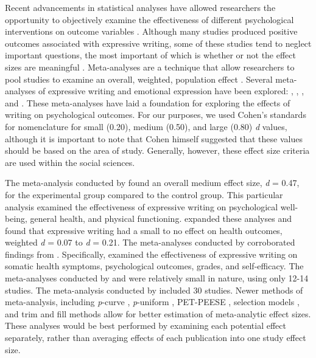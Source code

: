 \documentclass[english,man]{apa6}
\theoremstyle{definition}
\theoremstyle{definition}
\theoremstyle{definition}
\theoremstyle{remark}
\begin{document}
Recent advancements in statistical analyses have allowed researchers the
opportunity to objectively examine the effectiveness of different
psychological interventions on outcome variables
\autocites{Glass1976}{Borenstein2007}{Hedges1982}. Although many studies
produced positive outcomes associated with expressive writing, some of
these studies tend to neglect important questions, the most important of
which is whether or not the effect sizes are meaningful
\autocite{Smyth1998}. Meta-analyses are a technique that allow
researchers to pool studies to examine an overall, weighted, population
effect \autocite{Borenstein2007}. Several meta-analyses of expressive
writing and emotional expression have been explored:
\textcite{Smyth1998}, \textcite{Frisina2004a},
\textcite{Frattaroli2006}, and \textcite{Mogk2006}. These meta-analyses
have laid a foundation for exploring the effects of writing on
psychological outcomes. For our purposes, we used Cohen's
\autocite*{Cohen1988} standards for nomenclature for small (0.20),
medium (0.50), and large (0.80) \emph{d} values, although it is
important to note that Cohen himself suggested that these values should
be based on the area of study. Generally, however, these effect size
criteria are used within the social sciences.

The meta-analysis conducted by \textcite{Smyth1998} found an overall
medium effect size, \emph{d} = 0.47, for the experimental group compared
to the control group. This particular analysis examined the
effectiveness of expressive writing on psychological well-being, general
health, and physical functioning. \textcite{Frisina2004a} expanded these
analyses and found that expressive writing had a small to no effect on
health outcomes, weighted \emph{d} = 0.07 to \emph{d} = 0.21. The
meta-analyses conducted by \textcite{Mogk2006} corroborated findings
from \textcite{Frisina2004a}. Specifically, \textcite{Mogk2006} examined
the effectiveness of expressive writing on somatic health symptoms,
psychological outcomes, grades, and self-efficacy. The meta-analyses
conducted by \textcite{Smyth1998} and \textcite{Frisina2004a} were
relatively small in nature, using only 12-14 studies. The meta-analysis
conducted by \textcite{Mogk2006} included 30 studies. Newer methods of
meta-analysis, including \emph{p}-curve
\autocites{Simonsohn2014}{Simonsohn2015}, \emph{p}-uniform
\autocite{VanAert2016}, PET-PEESE \autocite{Stanley2014}, selection
models \autocite{Vevea1995}, and trim and fill methods
\autocite{Carter2014} allow for better estimation of meta-analytic
effect sizes. These analyses would be best performed by examining each
potential effect separately, rather than averaging effects of each
publication into one study effect size.
\end{document}

